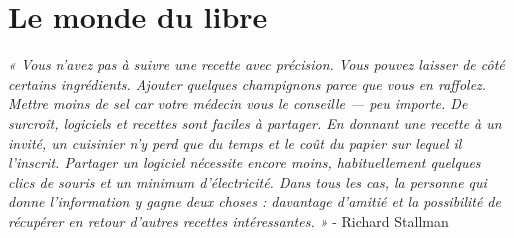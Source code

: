\documentclass[
  letterpaper,
  DIV=11,
  numbers=noendperiod]{scrreprt}
\begin{document}

\hypertarget{section}{%
\chapter{}\label{section}}


\hypertarget{section-1}{%
\chapter{}\label{section-1}}


\hypertarget{le-monde-du-libre}{%
\chapter{Le monde du libre}\label{le-monde-du-libre}}

\emph{« Vous n'avez pas à suivre une recette avec précision. Vous pouvez
laisser de côté certains ingrédients. Ajouter quelques champignons parce
que vous en raffolez. Mettre moins de sel car votre médecin vous le
conseille --- peu importe. De surcroît, logiciels et recettes sont
faciles à partager. En donnant une recette à un invité, un cuisinier n'y
perd que du temps et le coût du papier sur lequel il l'inscrit. Partager
un logiciel nécessite encore moins, habituellement quelques clics de
souris et un minimum d'électricité. Dans tous les cas, la personne qui
donne l'information y gagne deux choses : davantage d'amitié et la
possibilité de récupérer en retour d'autres recettes intéressantes. »} -
Richard Stallman
\end{document}

